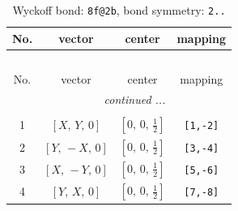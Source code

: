 \documentclass[fleqn,8pt]{jsarticle}
\begin{document}
\renewcommand{\arraystretch}{1.2}
\begin{longtable}{cccc}
\caption{Wyckoff bond: {\tt 8f@2b}, bond symmetry: {\tt 2..}}
 \\
 \hline \hline
No. & vector & center & mapping \\ \hline \endfirsthead

\multicolumn{3}{l}{\tablename\ \thetable{}} \\
 \hline \hline
No. & vector & center & mapping \\ \hline \endhead

 \hline \hline
\multicolumn{3}{r}{\footnotesize\it continued ...} \\ \endfoot

 \hline \hline
\multicolumn{3}{r}{} \\ \endlastfoot

1 & $\left[ X,\, Y,\, 0 \right]$ & $\left[ 0,\, 0,\, \frac{1}{2} \right]$ & {\tt [1,-2]} \\ \hline
2 & $\left[ Y,\, - X,\, 0 \right]$ & $\left[ 0,\, 0,\, \frac{1}{2} \right]$ & {\tt [3,-4]} \\ \hline
3 & $\left[ X,\, - Y,\, 0 \right]$ & $\left[ 0,\, 0,\, \frac{1}{2} \right]$ & {\tt [5,-6]} \\ \hline
4 & $\left[ Y,\, X,\, 0 \right]$ & $\left[ 0,\, 0,\, \frac{1}{2} \right]$ & {\tt [7,-8]} \\
\end{longtable}
\renewcommand{\arraystretch}{1.2}
\end{document}
